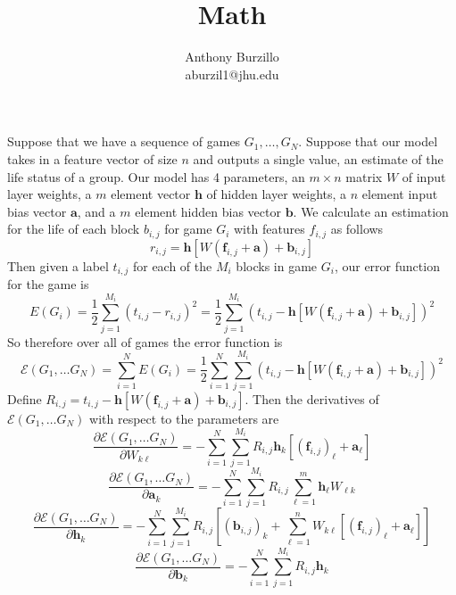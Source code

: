 \documentclass{amsart}
\title{Math}
\author{Anthony Burzillo\\aburzil1@jhu.edu}
\def\v#1{\mathbf{#1}}
\begin{document}
\maketitle

\def\touches#1#2{\mbox{touches}_{#1}{\left(#2\right)}}
\def\color#1{\mbox{color}{\left(#1\right)}}
\def\colorp#1{\mbox{color}^*{\left(#1\right)}}
\def\size#1{\mbox{size}{\left(#1\right)}}

Suppose that we have a sequence of games $G_1, \ldots, G_N$. Suppose that our model takes in a feature vector of
size $n$ and outputs a single value, an estimate of the life status of a group. Our model has 4 parameters, an
$m \times n$ matrix $W$ of input layer weights, a $m$ element vector $\v{ h }$ of hidden layer weights, a $n$ element
input bias vector $\v{ a }$, and a $m$ element hidden bias vector $\v{ b }$. We calculate an estimation for the life of
each block $b_{ i, j }$ for game $G_i$ with features $f_{ i, j }$ as follows
$$r_{ i, j } = \v{ h } [W (\v{ f }_{ i, j } + \v{ a }) + \v{ b }_{ i, j }]$$
Then given a label $t_{ i, j }$ for each of the $M_i$ blocks in game $G_i$, our error function for the game is
$$E(G_i) = \frac{ 1 }{ 2 } \sum_{ j = 1 }^{ M_i } (t_{ i, j } - r_{ i, j })^2
  = \frac{ 1 }{ 2 } \sum_{ j = 1 }^{ M_i } (t_{ i, j } - \v{ h } [W (\v{ f }_{ i, j } + \v{ a }) + \v{ b }_{ i, j }])^2$$
So therefore over all of games the error function is
$$\mathcal{ E }(G_1, \ldots G_N) = \sum_{ i = 1 }^N E(G_i)
  = \frac{ 1 }{ 2 } \sum_{ i = 1 }^N \sum_{ j = 1 }^{ M_i } (t_{ i, j } - \v{ h } [W (\v{ f }_{ i, j } + \v{ a }) + \v{ b }_{ i, j }])^2$$
Define $R_{ i, j } = t_{ i, j } - \v{ h } [W (\v{ f }_{ i, j } + \v{ a }) + \v{ b }_{ i, j }]$. Then the derivatives of
$\mathcal{ E }(G_1, \ldots G_N)$ with respect to the parameters are
$$\frac{ \partial \mathcal{ E }(G_1, \ldots G_N) }{ \partial W_{ k \ell } }
  = -\sum_{ i = 1 }^N \sum_{ j = 1 }^{ M_i } R_{ i, j } \v{ h }_k [(\v{ f }_{ i, j })_\ell + \v{ a }_\ell]$$
$$\frac{ \partial \mathcal{ E }(G_1, \ldots G_N) }{ \partial \v{ a }_k }
  = -\sum_{ i = 1 }^N \sum_{ j = 1 }^{ M_i } R_{ i, j } \sum_{ \ell = 1 }^m \v{ h }_\ell W_{ \ell k }$$
$$\frac{ \partial \mathcal{ E }(G_1, \ldots G_N) }{ \partial \v{ h }_k }
  = -\sum_{ i = 1 }^N \sum_{ j = 1 }^{ M_i } R_{ i, j }
 \left[(\v{ b }_{ i, j })_k + \sum_{ \ell = 1 }^n W_{ k \ell } [(\v{ f }_{ i, j })_\ell + \v{ a }_\ell]\right]$$
$$\frac{ \partial \mathcal{ E }(G_1, \ldots G_N) }{ \partial \v{ b }_k }
  = -\sum_{ i = 1 }^N \sum_{ j = 1 }^{ M_i } R_{ i, j } \v{ h }_k
$$
\end{document}
